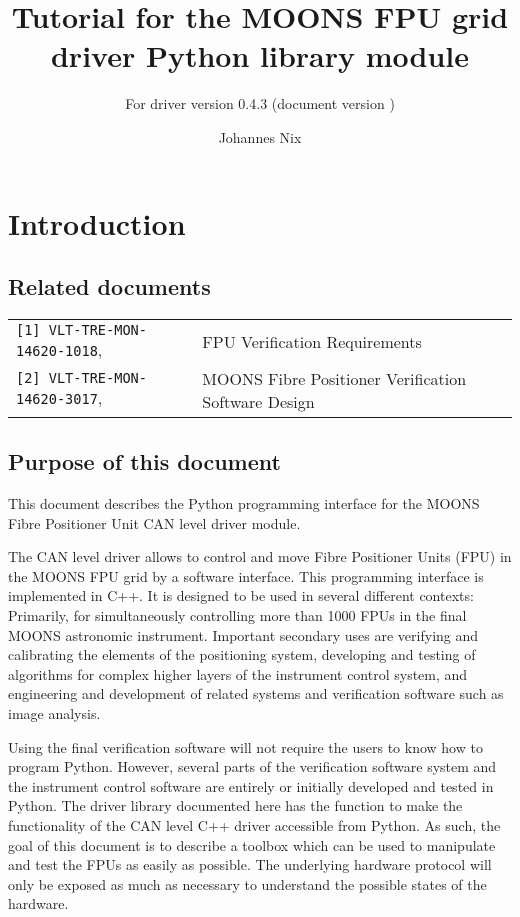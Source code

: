 \documentclass{scrartcl}[12pt,a4paper]
\begin{document}
\title{Tutorial for the MOONS FPU grid driver Python library
  module} \subtitle{For driver version 0.4.3 (document version \texttt{})}

\author{Johannes Nix}

\maketitle

\tableofcontents


\section{Introduction}
\subsection{Related documents}

\begin{tabular}{|ll|}
  \hline
\verb+[1] VLT-TRE-MON-14620-1018+, &  FPU Verification Requirements \\
\verb+[2] VLT-TRE-MON-14620-3017+, & MOONS Fibre Positioner Verification Software Design \\
\hline
\end{tabular}


\subsection{Purpose of this document}
This document describes the Python programming interface for the MOONS
Fibre Positioner Unit CAN level driver module.

The CAN level driver allows to control and move Fibre Positioner Units
(FPU) in the MOONS FPU grid by a software interface. This programming
interface is implemented in C++. It is designed to be used in several
different contexts: Primarily, for simultaneously controlling more
than 1000 FPUs in the final MOONS astronomic instrument. Important
secondary uses are verifying and calibrating the elements of the
positioning system, developing and testing of algorithms for complex
higher layers of the instrument control system, and engineering and
development of related systems and verification software such as image
analysis.

Using the final verification software will not require the users to
know how to program Python.  However, several parts of the
verification software system and the instrument control software are
entirely or initially developed and tested in Python.  The driver
library documented here has the function to make the functionality of
the CAN level C++ driver accessible from Python. As such, the goal of
this document is to describe a toolbox which can be used to manipulate
and test the FPUs as easily as possible. The underlying hardware
protocol will only be exposed as much as necessary to understand the
possible states of the hardware.
\end{document}
